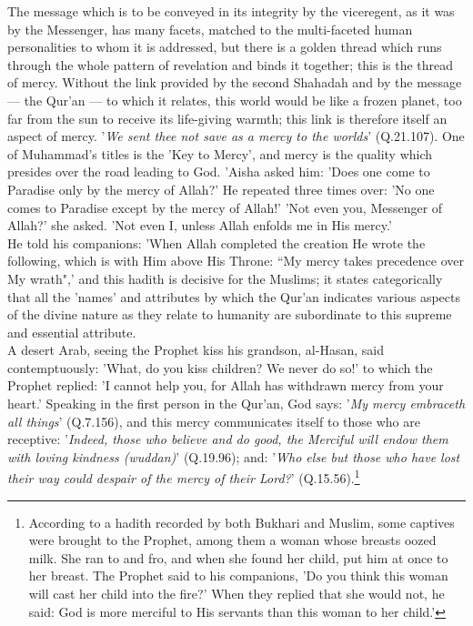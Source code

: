 \documentclass[10pt, twoside]{book}
\begin{document}
The message which is to be conveyed in its integrity by the viceregent, as it was by the Messenger, 
has many facets, matched to the multi\hyp{}faceted human personalities to whom it is addressed, but there 
is a golden thread which runs through the whole pattern of revelation and binds it together; this is 
the thread of mercy. Without the link provided by the second Shahadah and by the message --- the Qur'an 
--- to which it relates, this world would be like a frozen planet, too far from the sun to receive its 
life\hyp{}giving warmth; this link is therefore itself an aspect of mercy. '\emph{We sent thee not save as a 
mercy to the worlds}' (Q.21.107). One of Muhammad's titles is the 'Key to Mercy', and mercy is the 
quality which presides over the road leading to God. 'Aisha asked him: 'Does one come to Paradise 
only by the mercy of Allah?' He repeated three times over: 'No one comes to Paradise except by the 
mercy of Allah!' 'Not even you, Messenger of Allah?' she asked. 'Not even I, unless Allah enfolds me 
in His mercy.' \\

He told his companions: 'When Allah completed the creation He wrote the following, which is with Him 
above His Throne: ``My mercy takes precedence over My wrath",' and this hadith is decisive for the 
Muslims; it states categorically that all the 'names' and attributes by which the Qur'an indicates 
various aspects of the divine nature as they relate to humanity are subordinate to this supreme and 
essential attribute. \\

A desert Arab, seeing the Prophet kiss his grandson, al\hyp{}Hasan, said contemptuously: 'What, do you 
kiss children? We never do so!' to which the Prophet replied: 'I cannot help you, for Allah has 
withdrawn mercy from your heart.' Speaking in the first person in the Qur'an, God says: '\emph{My mercy 
embraceth all things}' (Q.7.156), and this mercy communicates itself to those who are receptive: 
'\emph{Indeed, those who believe and do good, the Merciful will endow them with loving kindness (wuddan)}' (Q.19.96); and: '\emph{Who else but those who have lost their way could despair of the mercy of their Lord?}' (Q.15.56).\footnote{According to a hadith recorded by both Bukhari and Muslim, some captives were brought to the Prophet, among them a woman whose breasts oozed milk. She ran to and fro, and when she found her child, put him at once to her breast. The Prophet said to his companions, 'Do you think this woman will cast her child into the fire?' When they replied that she would not, he said: God is more merciful to His servants than this woman to her child.'}\\
\end{document}
